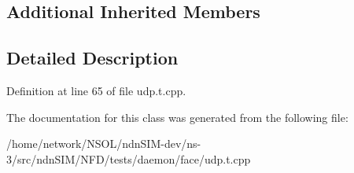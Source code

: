 \subsection*{Additional Inherited Members}


\subsection{Detailed Description}


Definition at line 65 of file udp.\+t.\+cpp.



The documentation for this class was generated from the following file\+:\begin{DoxyCompactItemize}
\item 
/home/network/\+N\+S\+O\+L/ndn\+S\+I\+M-\/dev/ns-\/3/src/ndn\+S\+I\+M/\+N\+F\+D/tests/daemon/face/udp.\+t.\+cpp\end{DoxyCompactItemize}
